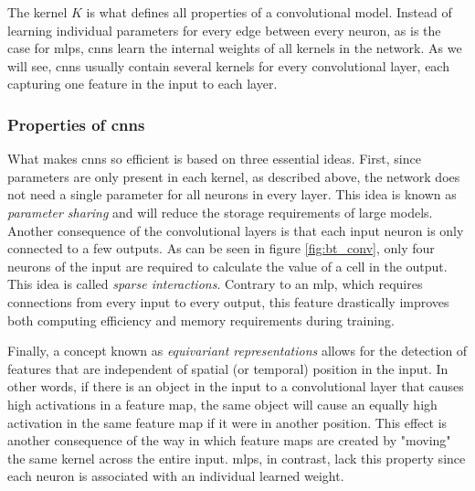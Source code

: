 The kernel $K$ is what defines all properties of a convolutional model. Instead of learning individual parameters for every edge between every neuron, as is the case for \acrshort{mlp}s, \acrshort{cnn}s learn the internal weights of all kernels in the network. As we will see, \acrshort{cnn}s usually contain several kernels for every convolutional layer, each capturing one feature in the input to each layer.

\subsubsection{Properties of \acrshort{cnn}s}

What makes \acrshort{cnn}s so efficient is based on three essential ideas. First, since parameters are only present in each kernel, as described above, the network does not need a single parameter for all neurons in every layer. This idea is known as \textit{parameter sharing} and will reduce the storage requirements of large models. Another consequence of the convolutional layers is that each input neuron is only connected to a few outputs. As can be seen in figure \ref{fig:bt_conv}, only four neurons of the input are required to calculate the value of a cell in the output. This idea is called \textit{sparse interactions}. Contrary to an \acrshort{mlp}, which requires connections from every input to every output, this feature drastically improves both computing efficiency and memory requirements during training.

Finally, a concept known as \textit{equivariant representations} allows for the detection of features that are independent of spatial (or temporal) position in the input. In other words, if there is an object in the input to a convolutional layer that causes high activations in a feature map, the same object will cause an equally high activation in the same feature map if it were in another position. This effect is another consequence of the way in which feature maps are created by "moving" the same kernel across the entire input. \acrshort{mlp}s, in contrast, lack this property since each neuron is associated with an individual learned weight. 



